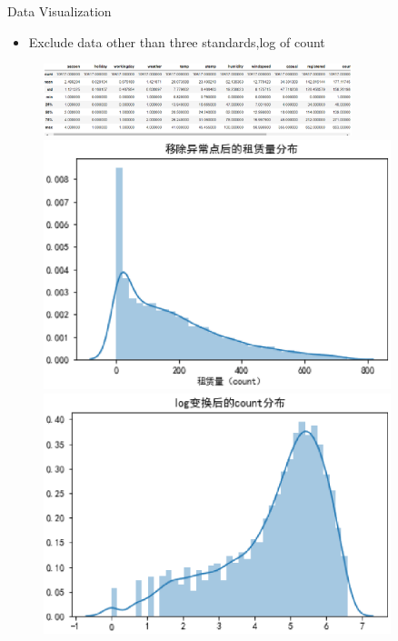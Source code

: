 \documentclass[
 size=14pt,
 paper=smartboard,  %
 mode=present, 		%
 display=slides, 	%
 style=tuliplab,  	%
 pauseslide,
 fleqn,leqno]{powerdot}
\begin{document}
\begin{slide}[toc=,bm=]{Data  Visualization}
  \begin{center}

    {
      \begin{itemize}
        \item Exclude data other than three standards,log of count
      \end{itemize} 
      \begin{figure}
        \centering
        \includegraphics[width=0.8\textwidth]{pic/b.eps}
        \centering
        \begin{minipage}[t]{0.48\textwidth}
        \centering
        \includegraphics[width=0.9\textwidth]{pic/count a.eps}
        \end{minipage}
        \begin{minipage}[t]{0.48\textwidth}
        \centering
        \includegraphics[width=0.9\textwidth]{pic/log .eps}
        \end{minipage}
      \end{figure}   
    }
    \end{center}
  


\end{slide}
\end{document}
